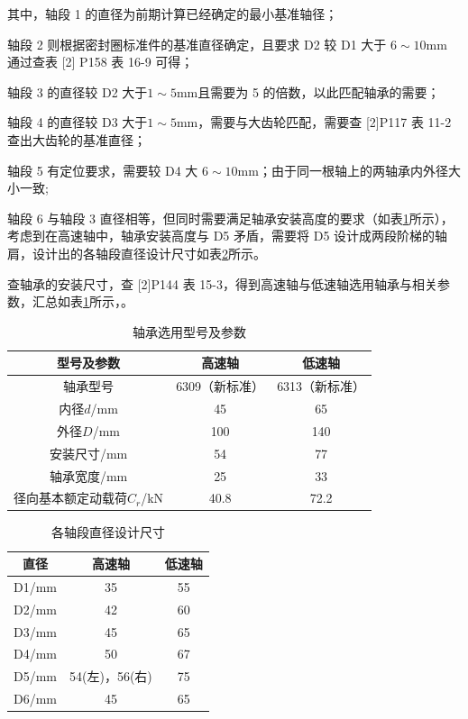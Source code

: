 \documentclass[12pt]{ctexart}
\begin{document}
其中，轴段 1 的直径为前期计算已经确定的最小基准轴径；

轴段 2 则根据密封圈标准件的基准直径确定，且要求 D2 较 D1 大于 $6\sim 10 \text{mm}$ 通过查表 [2] P158 表 16-9 可得；

轴段 3 的直径较 D2 大于$1\sim 5\text{mm}$且需要为 5 的倍数，以此匹配轴承的需要；

轴段 4 的直径较 D3 大于$1\sim 5\text{mm}$，需要与大齿轮匹配，需要查 [2]P117 表 11-2 查出大齿轮的基准直径；

轴段 5 有定位要求，需要较 D4 大 $6 \sim 10 \text{mm}$；由于同一根轴上的两轴承内外径大小一致;

轴段 6 与轴段 3 直径相等，但同时需要满足轴承安装高度的要求（如表\ref{table10}所示），考虑到在高速轴中，轴承安装高度与 D5 矛盾，需要将 D5 设计成两段阶梯的轴肩，设计出的各轴段直径设计尺寸如表\ref{table9}所示。

查轴承的安装尺寸，查 [2]P144 表 15-3，得到高速轴与低速轴选用轴承与相关参数，汇总如表\ref{table10}所示，。
\begin{table}[htbp]
    \centering
    \setlength{\belowcaptionskip}{0.3cm}
    \caption{轴承选用型号及参数}
    \begin{tabular}{c c c}
        \toprule
        型号及参数 & 高速轴 & 低速轴\\
        \midrule
        轴承型号 & 6309（新标准） & 6313（新标准） \\
        内径$d$/mm & 45 & 65 \\
        外径$D$/mm & 100 & 140 \\
        安装尺寸/mm & 54 & 77 \\
        轴承宽度/mm & 25 & 33 \\
        径向基本额定动载荷$C_r$/kN & 40.8 & 72.2 \\

        \bottomrule
    \end{tabular}

    \label{table10}
\end{table}


\begin{table}[htbp]
    \centering
    \setlength{\belowcaptionskip}{0.3cm}
    \caption{各轴段直径设计尺寸}
    \begin{tabular}{c c c}
        \toprule
        直径 & 高速轴 & 低速轴\\
        \midrule
        D1/mm & 35 & 55 \\
        D2/mm & 42 & 60 \\
        D3/mm & 45 & 65 \\
        D4/mm & 50 & 67 \\
        D5/mm & 54(左)，56(右) & 75 \\
        D6/mm & 45 & 65 \\
        \bottomrule
    \end{tabular}
    
    \label{table9}
\end{table}
\end{document}
